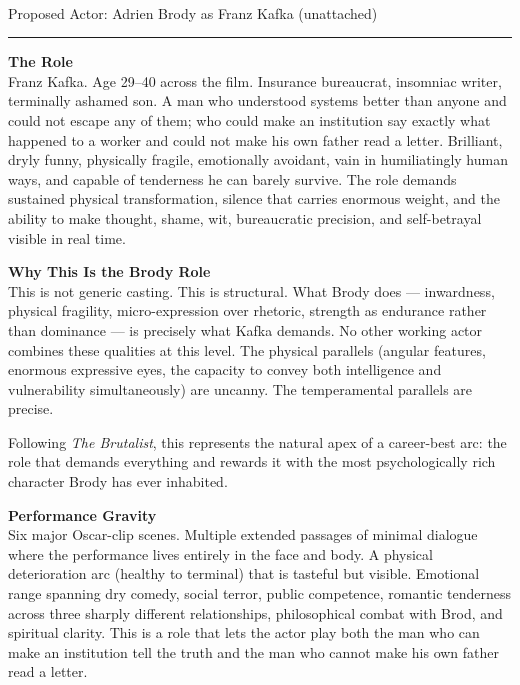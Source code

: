 \documentclass[11pt,letterpaper]{article}
\begin{document}
\begin{center}
{\Large\bfseries\sffamily \filmtitleupper}\\[3pt]
{\normalsize\sffamily\color{kafkagray} Proposed Actor: Adrien Brody as Franz Kafka (unattached)}
\end{center}
\vspace{2pt}
\textcolor{sectionrule}{\rule{\textwidth}{0.5pt}}
\vspace{4pt}

\textbf{The Role}\\
Franz Kafka. Age 29--40 across the film. Insurance bureaucrat, insomniac writer, terminally ashamed son. A man who understood systems better than anyone and could not escape any of them; who could make an institution say exactly what happened to a worker and could not make his own father read a letter. Brilliant, dryly funny, physically fragile, emotionally avoidant, vain in humiliatingly human ways, and capable of tenderness he can barely survive. The role demands sustained physical transformation, silence that carries enormous weight, and the ability to make thought, shame, wit, bureaucratic precision, and self-betrayal visible in real time.

\vspace{2pt}

\textbf{Why This Is the Brody Role}\\
This is not generic casting. This is structural. What Brody does --- inwardness, physical fragility, micro-expression over rhetoric, strength as endurance rather than dominance --- is precisely what Kafka demands. No other working actor combines these qualities at this level. The physical parallels (angular features, enormous expressive eyes, the capacity to convey both intelligence and vulnerability simultaneously) are uncanny. The temperamental parallels are precise.

Following \textit{The Brutalist}, this represents the natural apex of a career-best arc: the role that demands everything and rewards it with the most psychologically rich character Brody has ever inhabited.

\vspace{2pt}

\textbf{Performance Gravity}\\
Six major Oscar-clip scenes. Multiple extended passages of minimal dialogue where the performance lives entirely in the face and body. A physical deterioration arc (healthy to terminal) that is tasteful but visible. Emotional range spanning dry comedy, social terror, public competence, romantic tenderness across three sharply different relationships, philosophical combat with Brod, and spiritual clarity. This is a role that lets the actor play both the man who can make an institution tell the truth and the man who cannot make his own father read a letter.
\end{document}
